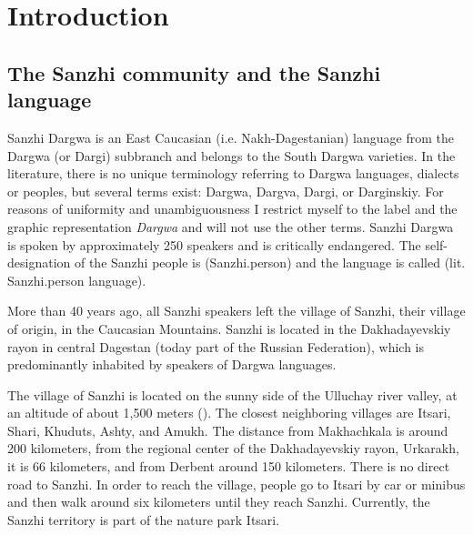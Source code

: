 
\chapter{Introduction}
\label{cpt:Introduction}


\section{The Sanzhi community and the Sanzhi language}
\label{sec:The Sanzhi community and the Sanzhi language}

Sanzhi Dargwa is an East Caucasian (i.e. Nakh-Dagestanian) language from the Dargwa (or Dargi) subbranch and belongs to the South Dargwa varieties. In the literature, there is no unique terminology referring to Dargwa languages, dialects or peoples, but several terms exist: Dargwa, Dargva, Dargi, or Darginskiy. For reasons of uniformity and unambiguousness I restrict myself to the label and the graphic representation \textit{Dargwa} and will not use the other terms. Sanzhi Dargwa is spoken by approximately 250 speakers and is critically endangered. The self-designation of the Sanzhi people is  (Sanzhi.person) and the language is called  (lit. Sanzhi.person language).

More than 40 years ago, all Sanzhi speakers left the village of Sanzhi, their village of origin, in the Caucasian Mountains. Sanzhi is located in the Dakhadayevskiy rayon in central Dagestan (today part of the Russian Federation), which is predominantly inhabited by speakers of Dargwa languages.

The village of Sanzhi is located on the sunny side of the Ulluchay river valley, at an altitude of about 1,500 meters (). The closest neighboring villages are Itsari, Shari, Khuduts, Ashty, and Amukh. The distance from Makhachkala is around 200 kilometers, from the regional center of the Dakhadayevskiy rayon, Urkarakh, it is 66 kilometers, and from Derbent around 150 kilometers. There is no direct road to Sanzhi. In order to reach the village, people go to Itsari by car or minibus and then walk around six kilometers until they reach Sanzhi. Currently, the Sanzhi territory is part of the nature park Itsari.

